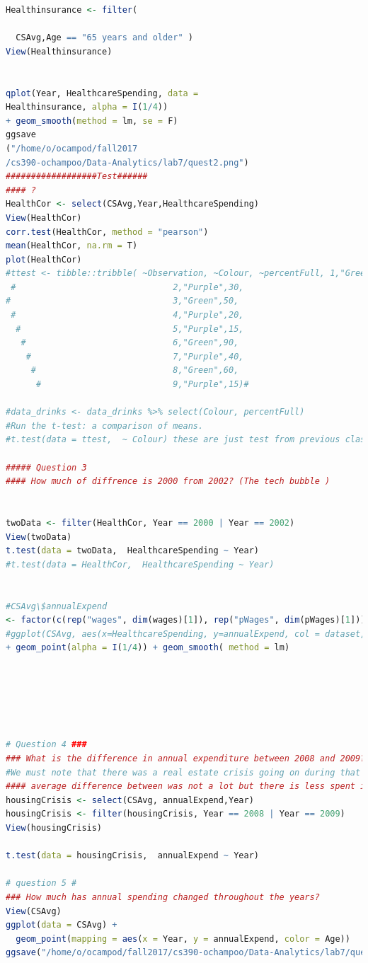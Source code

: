 \documentclass[11pt]{article}
\begin{document}
\begin{lstlisting}[language=R]
Healthinsurance <- filter(
  
  CSAvg,Age == "65 years and older" )
View(Healthinsurance)


qplot(Year, HealthcareSpending, data = 
Healthinsurance, alpha = I(1/4)) 
+ geom_smooth(method = lm, se = F)
ggsave
("/home/o/ocampod/fall2017
/cs390-ochampoo/Data-Analytics/lab7/quest2.png")
##################Test######
#### ?   
HealthCor <- select(CSAvg,Year,HealthcareSpending)
View(HealthCor)
corr.test(HealthCor, method = "pearson")
mean(HealthCor, na.rm = T)
plot(HealthCor)
#ttest <- tibble::tribble( ~Observation, ~Colour, ~percentFull, 1,"Green", 70,
 #                               2,"Purple",30,
#                                3,"Green",50,
 #                               4,"Purple",20,
  #                              5,"Purple",15,
   #                             6,"Green",90,
    #                            7,"Purple",40,
     #                           8,"Green",60,
      #                          9,"Purple",15)#

#data_drinks <- data_drinks %>% select(Colour, percentFull)
#Run the t-test: a comparison of means.
#t.test(data = ttest,  ~ Colour) these are just test from previous class codes 

##### Question 3
#### How much of diffrence is 2000 from 2002? (The tech bubble )


twoData <- filter(HealthCor, Year == 2000 | Year == 2002)
View(twoData)
t.test(data = twoData,  HealthcareSpending ~ Year)
#t.test(data = HealthCor,  HealthcareSpending ~ Year)


#CSAvg\$annualExpend
<- factor(c(rep("wages", dim(wages)[1]), rep("pWages", dim(pWages)[1])))
#ggplot(CSAvg, aes(x=HealthcareSpending, y=annualExpend, col = dataset, shape = dataset)) 
+ geom_point(alpha = I(1/4)) + geom_smooth( method = lm)






# Question 4 ###
### What is the difference in annual expenditure between 2008 and 2009?
#We must note that there was a real estate crisis going on during that time. 
#### average difference between was not a lot but there is less spent in 2009 according to the T.test data. 
housingCrisis <- select(CSAvg, annualExpend,Year)
housingCrisis <- filter(housingCrisis, Year == 2008 | Year == 2009) 
View(housingCrisis)

t.test(data = housingCrisis,  annualExpend ~ Year)
 
# question 5 #
### How much has annual spending changed throughout the years?
View(CSAvg)
ggplot(data = CSAvg) +
  geom_point(mapping = aes(x = Year, y = annualExpend, color = Age))
ggsave("/home/o/ocampod/fall2017/cs390-ochampoo/Data-Analytics/lab7/quest5.png")




\end{lstlisting}
\end{document}
